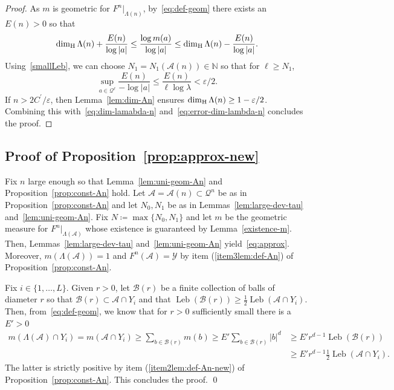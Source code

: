 \documentclass[english, 10pt]{amsart}
\numberwithin{equation}{section}
\theoremstyle{definition}
\theoremstyle{plain}
\theoremstyle{plain}
\theoremstyle{definition}
\theoremstyle{definition}
\theoremstyle{plain}
\theoremstyle{definition}
\newcommand{\Leb}{\operatorname{Leb}}
\newcommand{\eps}{\varepsilon}
\newcommand{\cY}{{\mathcal Y}}
\newcommand{\cA}{{\mathcal A}}
\newcommand{\cB}{{\mathcal B}}
\newcommand{\cQ}{{\mathcal Q}}
\newcommand{\N}{{\mathbb N}}
\newcommand{\bN}{\N}
\numberwithin{equation}{section}
\begin{document}
\begin{proof}
As $m$ is geometric for $F^n|_{\Lambda(n)}$, by~\eqref{eq:def-geom}  there exists an $E(n) > 0$ so that 
  \begin{equation}\label{eq:dim-lamabda-n}
    \dim_{ \rm H } \Lambda (n) + \frac{ E(n) }{ \log |a| }
    \le
    \frac{ \log m (a) }{ \log |a| }
    \le
    \dim_{ \rm H } \Lambda (n) - \frac{ E(n) }{ \log |a| }
    .
  \end{equation}
 Using~\eqref{smallLeb},
 we can choose $N_1 = N_1 (\cA(n)) \in\bN$ so that for $\ell \ge N_1$,
 \begin{equation}\label{eq:error-dim-lambda-n}
 	\sup_{a\in\cQ^\ell}\frac{E(n)}{-\log|a|}
	\le \frac{E(n)}{\ell \log\lambda}
	<\eps/2
  .
 \end{equation}
 If $n > 2C^\prime / \eps$, then Lemma~\ref{lem:dim-An} ensures $\dim_{ \rm H } \Lambda (n) \ge 1 - \eps/2$. Combining this with~\eqref{eq:dim-lamabda-n} and~\eqref{eq:error-dim-lambda-n} concludes the proof.
\end{proof}


\subsection{Proof of Proposition~\ref{prop:approx-new}}
\label{sec:proof-of-approx}

Fix $n$ large enough so that Lemma~\ref{lem:uni-geom-An} and  Proposition~\ref{prop:const-An} hold.
Let $\cA = \cA(n) \subset \cQ^n$  be as in Proposition~\ref{prop:const-An} and let $N_0,N_1$ be as in Lemmas~\ref{lem:large-dev-tau} and~\ref{lem:uni-geom-An}. Fix $N \coloneqq \max\{ N_0, N_1\}$ and let $m$ be the geometric measure for $F^n|_{\Lambda ( \cA)}$ whose existence is guaranteed by Lemma~\ref{existence-m}. Then, Lemmas~\ref{lem:large-dev-tau} and~\ref{lem:uni-geom-An} yield~\eqref{eq:approx}. Moreover, $m ( \Lambda ( \cA ) )= 1$ and $F^n ( \cA ) = \cY$ by item (\ref{item3lem:def-An}) of Proposition~\ref{prop:const-An}.

Fix $i \in \{ 1 , \ldots, L\}$. Given $r > 0$, let $\cB(r)$ be a finite collection of balls of diameter $r$ so that  $\cB (r) \subset \cA \cap Y_i$  and that $\Leb (\cB(r) ) \ge \frac12\Leb ( \cA \cap Y_i )$. Then, from~\eqref{eq:def-geom}, we know that  for $r > 0$ sufficiently small there is a $E' > 0$ 
\begin{align*}
   m( \Lambda ( \cA ) \cap Y_i ) 
   = m ( \cA \cap Y_i )
   \ge \sum_{ b \in \cB(r) } m (b) 
   \ge E' \sum_{ b \in \cB(r) } |b|^d
   &\ge E' r^{d-1} \Leb ( \cB(r) ) \\
   &\ge E' r^{d-1} \frac12 \Leb (  \cA \cap Y_i  ).
\end{align*}
The latter is strictly positive by item (\ref{item2lem:def-An-new}) of Proposition~\ref{prop:const-An}.
This concludes the proof.
\qed
\end{document}
